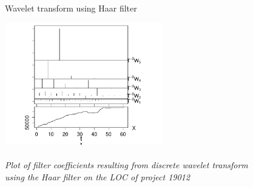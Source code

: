 \begin{figure}[H]
\caption{Wavelet transform using Haar filter}\label{figure:haar_filter}
\caption*{\\[1em]\footnotesize\textit{Plot of filter coefficients resulting from
discrete wavelet transform using the Haar filter on the LOC of project 19012}}
\centering
	\includegraphics[width=196pt]{images/dwt_19012.pdf}
\end{figure}